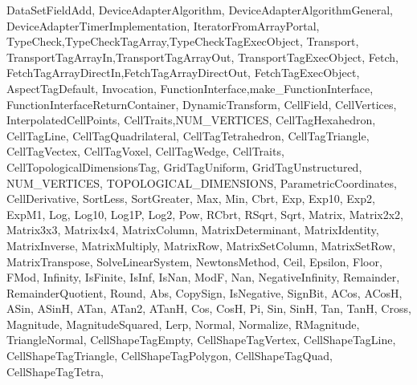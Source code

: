 {{                   DataSetFieldAdd,
                   DeviceAdapterAlgorithm, DeviceAdapterAlgorithmGeneral,
                   DeviceAdapterTimerImplementation,
                   IteratorFromArrayPortal,
                   TypeCheck,TypeCheckTagArray,TypeCheckTagExecObject,
                   Transport,
                   TransportTagArrayIn,TransportTagArrayOut,
                   TransportTagExecObject,
                   Fetch,
                   FetchTagArrayDirectIn,FetchTagArrayDirectOut,
                   FetchTagExecObject,
                   AspectTagDefault,
                   Invocation,
                   FunctionInterface,make_FunctionInterface,
                   FunctionInterfaceReturnContainer,
                   DynamicTransform,
                   CellField, CellVertices,
                   InterpolatedCellPoints,
                   CellTraits,NUM_VERTICES,
                   CellTagHexahedron, CellTagLine, CellTagQuadrilateral,
                   CellTagTetrahedron, CellTagTriangle, CellTagVectex,
                   CellTagVoxel, CellTagWedge,
                   CellTraits,
                   CellTopologicalDimensionsTag,
                   GridTagUniform, GridTagUnstructured,
                   NUM_VERTICES, TOPOLOGICAL_DIMENSIONS,
                   ParametricCoordinates, CellDerivative,
                   SortLess, SortGreater,
                   Max, Min,
                   Cbrt, Exp, Exp10, Exp2, ExpM1, Log, Log10, Log1P, Log2,
                   Pow, RCbrt, RSqrt, Sqrt,
                   Matrix, Matrix2x2, Matrix3x3, Matrix4x4,
                   MatrixColumn, MatrixDeterminant, MatrixIdentity,
                   MatrixInverse, MatrixMultiply, MatrixRow,
                   MatrixSetColumn, MatrixSetRow, MatrixTranspose,
                   SolveLinearSystem,
                   NewtonsMethod,
                   Ceil, Epsilon, Floor, FMod, Infinity, IsFinite, IsInf,
                   IsNan, ModF, Nan, NegativeInfinity, Remainder,
                   RemainderQuotient, Round,
                   Abs, CopySign, IsNegative, SignBit,
                   ACos, ACosH, ASin, ASinH, ATan, ATan2, ATanH, Cos, CosH,
                   Pi, Sin, SinH, Tan, TanH,
                   Cross, Magnitude, MagnitudeSquared, Lerp, Normal,
                   Normalize, RMagnitude, TriangleNormal,
                   CellShapeTagEmpty,
                   CellShapeTagVertex,
                   CellShapeTagLine,
                   CellShapeTagTriangle,
                   CellShapeTagPolygon,
                   CellShapeTagQuad,
                   CellShapeTagTetra,
}}
